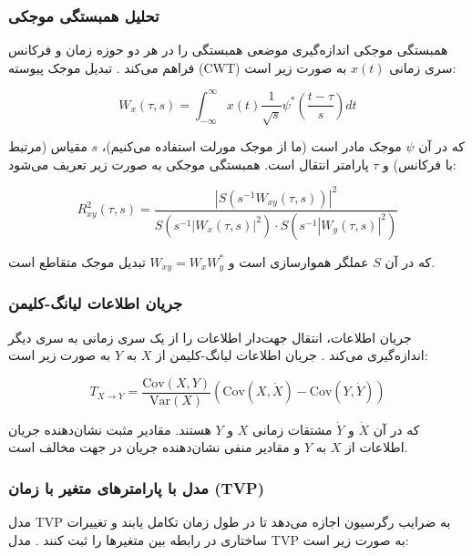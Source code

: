 \documentclass[12pt,a4paper,twocolumn]{article}
\begin{document}
\subsubsection{تحلیل همبستگی موجکی}

همبستگی موجکی اندازه‌گیری موضعی همبستگی را در هر دو حوزه زمان و فرکانس فراهم می‌کند \citep{torrence1998}. تبدیل موجک پیوسته (CWT) سری زمانی $x(t)$ به صورت زیر است:

\begin{equation}
W_x(\tau, s) = \int_{-\infty}^{\infty} x(t) \frac{1}{\sqrt{s}} \psi^*\left(\frac{t-\tau}{s}\right) dt
\end{equation}

که در آن $\psi$ موجک مادر است (ما از موجک مورلت استفاده می‌کنیم)، $s$ مقیاس (مرتبط با فرکانس) و $\tau$ پارامتر انتقال است. همبستگی موجکی به صورت زیر تعریف می‌شود:

\begin{equation}
R_{xy}^2(\tau, s) = \frac{|S(s^{-1} W_{xy}(\tau, s))|^2}{S(s^{-1} |W_x(\tau, s)|^2) \cdot S(s^{-1} |W_y(\tau, s)|^2)}
\end{equation}

که در آن $S$ عملگر هموارسازی است و $W_{xy} = W_x W_y^*$ تبدیل موجک متقاطع است.

\subsubsection{جریان اطلاعات لیانگ-کلیمن}

جریان اطلاعات، انتقال جهت‌دار اطلاعات را از یک سری زمانی به سری دیگر اندازه‌گیری می‌کند \citep{liang2016}. جریان اطلاعات لیانگ-کلیمن از $X$ به $Y$ به صورت زیر است:

\begin{equation}
T_{X \to Y} = \frac{\text{Cov}(X, Y)}{\text{Var}(X)} \left( \text{Cov}(X, \dot{X}) - \text{Cov}(Y, \dot{Y}) \right)
\end{equation}

که در آن $\dot{X}$ و $\dot{Y}$ مشتقات زمانی $X$ و $Y$ هستند. مقادیر مثبت نشان‌دهنده جریان اطلاعات از $X$ به $Y$ و مقادیر منفی نشان‌دهنده جریان در جهت مخالف است.

\subsubsection{مدل با پارامترهای متغیر با زمان (TVP)}

مدل TVP به ضرایب رگرسیون اجازه می‌دهد تا در طول زمان تکامل یابند و تغییرات ساختاری در رابطه بین متغیرها را ثبت کنند \citep{primiceri2005}. مدل TVP به صورت زیر است:
\end{document}
